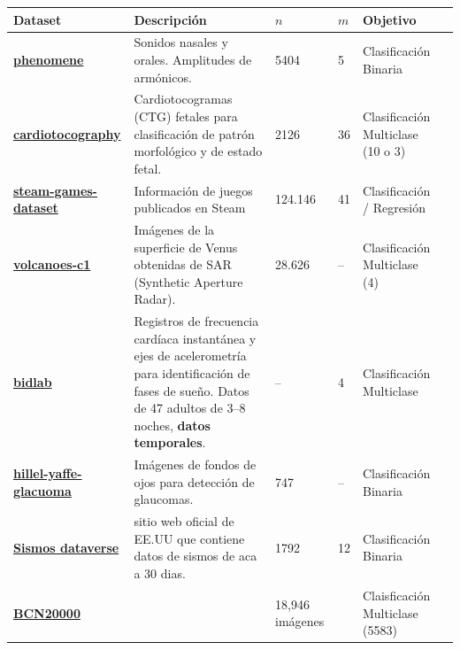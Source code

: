 \documentclass{article}
\begin{document}
\begin{table}[h!]
\centering
\renewcommand{\arraystretch}{1.4}
    \begin{tabular}{>{\bfseries}p{3.5cm} p{6cm} p{1cm} p{0.8cm} p{1.8cm} p{2cm}}
    \toprule
    Dataset & Descripción & $n$ & $m$ & Objetivo \\
    \midrule
    \href{https://www.openml.org/search?type=data&sort=runs&status=active&id=1489}{phenomene} 
    & Sonidos nasales y orales. Amplitudes de armónicos.  
    & 5404  & 5 & Clasificación Binaria  \\
    \midrule
    \href{https://www.openml.org/search?type=data&sort=runs&status=active&id=1466}{cardiotocography} 
    & Cardiotocogramas (CTG) fetales para clasificación de patrón morfológico y de estado fetal. 
    & 2126 & 36 & Clasificación Multiclase (10 o 3) \\
    \midrule
    \href{https://huggingface.co/datasets/FronkonGames/steam-games-dataset}{steam-games-dataset} 
    & Información de juegos publicados en Steam 
    & 124.146 & 41 & Clasificación / Regresión \\
    \midrule
    \href{https://www.openml.org/search?type=data&status=active&qualities.NumberOfInstances=between_10000_100000&id=1537}{volcanoes-c1\footnotemark}
    & Imágenes de la superficie de Venus obtenidas de SAR (Synthetic Aperture Radar).
    & 28.626 & -- & Clasificación Multiclase (4) \\
    \midrule
    \href{https://physionet.org/content/bidsleep-dataset/1.0.0/}{bidlab} 
    & Registros de frecuencia cardíaca instantánea y ejes de acelerometría para identificación de fases de sueño. Datos de 47 adultos de 3--8 noches, \textbf{datos temporales}.
    & -- & 4 & Clasificación Multiclase \\
    \midrule
    \href{https://physionet.org/content/hillel-yaffe-glaucoma-dataset/1.1.0/}{hillel-yaffe-glacuoma}
    & Imágenes de fondos de ojos para detección de glaucomas. 
    & 747 & -- & Clasificación Binaria \\
    \midrule
    \href{https://www.usgs.gov/programs/earthquake-hazards/lists-maps-and-statistics}{Sismos dataverse}
    & sitio web oficial de EE.UU que contiene datos de sismos de aca a 30 dias. 
    & 1792 & 12 & Clasificación Binaria \\
    \midrule
    \href{https://api.isic-archive.com/collections/249/}{BCN20000} 
    & 
    & 18,946 imágenes &  & Claisficación Multiclase (5583)\\
    \bottomrule
    \end{tabular}
\end{table}

\end{document}
